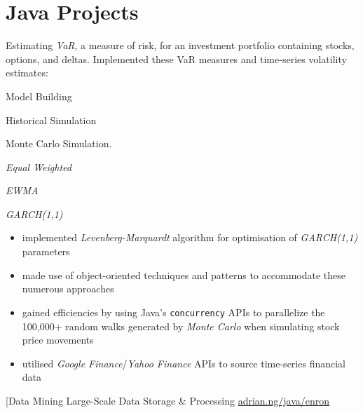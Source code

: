 \documentclass[letterpaper,11pt]{article}
\begin{document}
\section{Java Projects}
\begin{description}[style=multiline,leftmargin=3cm]
	\item[Value at Risk \textnormal{Dissertation} \textnormal{\tiny
		      \href{https://adrian.ng/java/var/}{adrian.ng/java/var/}}]
	      Estimating \textit{VaR}, a measure of risk, for an investment portfolio containing stocks, options, and deltas. Implemented these VaR measures and time-series volatility estimates:

	      \begin{description}[style=multiline,leftmargin=4cm]
		      \item[VaR Measures]
		            \begin{itemize*}
			            \item Model Building
			            \item Historical Simulation
			            \item Monte Carlo Simulation.
		            \end{itemize*}
		      \item[Volatility Estimates]
		            \begin{itemize*}
			            \item \textit{Equal Weighted}
			            \item \textit{EWMA}
			            \item \textit{GARCH(1,1)}
		            \end{itemize*}
	      \end{description}
	      \begin{itemize}
		      \item implemented \textit{Levenberg-Marquardt} algorithm for optimisation of \textit{GARCH(1,1)} parameters
		      \item made use of object-oriented techniques and patterns to accommodate these numerous approaches
		      \item gained efficiencies by using Java's \texttt{concurrency} APIs to parallelize the 100,000+ random walks generated by \textit{Monte Carlo} when simulating stock price movements
		      \item utilised \textit{Google Finance}/\textit{Yahoo Finance} APIs to source time-series financial data
	      \end{itemize}
	\item[Data Mining \textnormal{Large-Scale Data Storage \& Processing} \textnormal{\tiny\href{https://github.com/Adrian-Ng/HadoopEnron}{adrian.ng/java/enron}} \textnormal{\tiny
}
\end{description}
\end{document}

